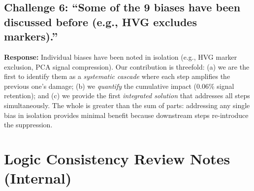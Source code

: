 \subsection*{Challenge 6: ``Some of the 9 biases have been discussed before (e.g., HVG excludes markers).''}

\textbf{Response:} Individual biases have been noted in isolation (e.g., HVG marker exclusion, PCA signal compression). Our contribution is threefold: (a) we are the first to identify them as a \textit{systematic cascade} where each step amplifies the previous one's damage; (b) we \textit{quantify} the cumulative impact (0.06\% signal retention); and (c) we provide the first \textit{integrated solution} that addresses all steps simultaneously. The whole is greater than the sum of parts: addressing any single bias in isolation provides minimal benefit because downstream steps re-introduce the suppression.


\section*{Logic Consistency Review Notes (Internal)}


